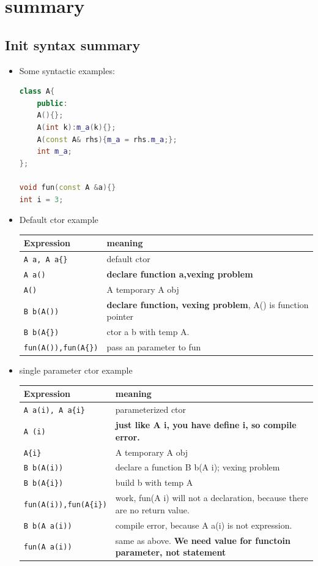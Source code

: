 \documentclass[a4paper,11pt,twoside]{book}
\newcommand{\tophline}{\hline }
\newcommand{\bottomhline}{\\ \hline }
\newcommand{\tophline}{ }
\newcommand{\bottomhline}{ }
\begin{document}
\section{summary}

\subsection{Init syntax summary}
\begin{itemize}
	\item Some syntactic examples: 
\begin{lstlisting}[frame=single, language=c++]
class A{
	public:
	A(){};
	A(int k):m_a(k){};
	A(const A& rhs){m_a = rhs.m_a;};
	int m_a;
};
	
void fun(const A &a){}
int i = 3;
\end{lstlisting}
	
	\item Default ctor example \newline
	\begin{tabular}{|p{}|p{}|}
		\tophline
		Expression & meaning \\
		\tophline
		\texttt{A a, A a\{\}} & default ctor \\
		\tophline
		\texttt{A a()} & \textbf{declare function a,vexing problem} \\
		\tophline
		\texttt{A()} & A temporary A obj\\
		\tophline
		\texttt{B b(A())} & \textbf{declare function, vexing problem}, A() is function pointer \\
		\tophline
		\texttt{B b(A\{\})} & ctor a b with temp A. \\
		\tophline
		\texttt{fun(A()),fun(A\{\})} & pass an parameter to fun
		\bottomhline
	\end{tabular}
	\item single parameter ctor example \newline
	
	\begin{tabular}{|p{}|p{}|}
		\tophline
		Expression & meaning \\
		\tophline
		\texttt{A a(i), A a\{i\}} & parameterized ctor\\
		\tophline
		\texttt{A (i)} & \textbf{just like A i, you have define i, so compile error.} \\
		\tophline
		\texttt{A\{i\}} & A temporary A obj\\
		\tophline
		\texttt{B b(A(i))} & declare a function B b(A i); vexing problem \\
		\tophline
		\texttt{B b(A\{i\})} & build b with temp A\\
		\tophline
		\texttt{fun(A(i)),fun(A\{i\})} & work, fun(A i) will not a declaration, because there are no return value.\\
		\tophline
		\texttt{B b(A a(i))}  & compile error, because A a(i) is not expression. \\
		\tophline
		\texttt{fun(A a(i))} & same as above. \textbf{We need value for functoin parameter, not statement} 
		\bottomhline
	\end{tabular}
	

\end{itemize}
\end{document}
